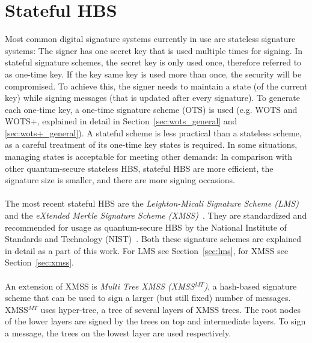 \section{Stateful HBS} %
Most common digital signature systems currently in use are stateless signature systems: The signer has one secret key that is used multiple times for signing. In stateful signature schemes, the secret key is only used once, therefore referred to as one-time key. If the key same key is used more than once, the security will be compromised. 
To achieve this, the signer needs to maintain a state (of the current key) while signing messages (that is updated after every signature). To generate each one-time key, a one-time signature scheme (OTS) is used (e.g. WOTS and WOTS+, explained in detail in Section~\ref{sec:wots_general} and \ref{sec:wots+_general}).
A stateful scheme is less practical than a stateless scheme, as a careful treatment of its one-time key states is required. 
In some situations, managing states is acceptable for meeting other demands: In comparison with other quantum-secure stateless HBS, stateful HBS are more efficient, the signature size is smaller, and there are more signing occasions.~\cite{properties_stateless_HBS_2022}
\\ \\
The most recent stateful HBS are the \textit{Leighton-Micali Signature Scheme (LMS)}~\cite{LMS_RFC8554} and the \textit{eXtended Merkle Signature Scheme (XMSS)}~\cite{xmss_RFC8391}. They are standardized and recommended for usage as quantum-secure HBS by the National Institute of Standards and Technology (NIST)~\cite{stateful_hashbased_sign_schemes_NIST_2020}. Both these signature schemes are explained in detail as a part of this work. For LMS see Section~\ref{sec:lms}, for XMSS see Section~\ref{sec:xmss}.
\\ \\
An extension of XMSS is \textit{Multi Tree XMSS (XMSS$^{MT}$)}, a hash-based
signature scheme that can be used to sign a larger (but still fixed) number of messages.
XMSS$^{MT}$ uses hyper-tree, a tree of several layers of XMSS trees. The root nodes of the lower layers are signed by the trees on top and intermediate layers. To sign a message, the trees on the lowest layer are used respectively.~\cite{xmss_multitree_2013,xmss_RFC8391}

